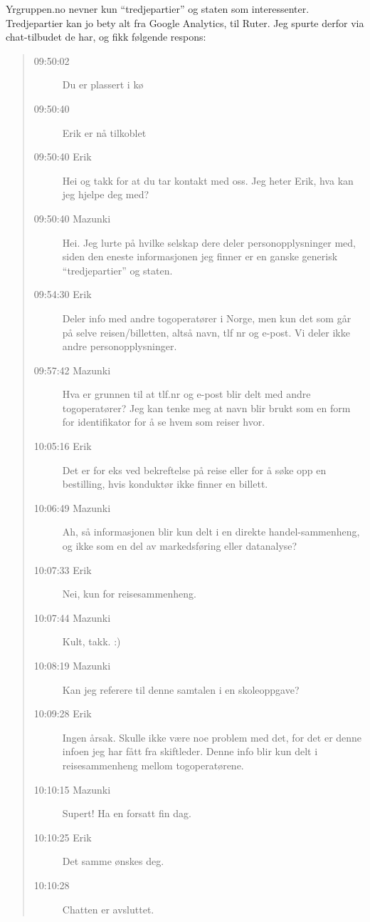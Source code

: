\documentclass{../../myassignment}
\begin{document}
	\begin{answer}
		Yrgruppen.no nevner kun ``tredjepartier'' og staten som interessenter. Tredjepartier kan jo bety alt fra Google Analytics, til Ruter. Jeg spurte derfor via chat-tilbudet de har, og fikk følgende respons: 

			\begin{quote}
				\begin{description}
					\item [09:50:02] Du er plassert i kø
					\item [09:50:40] Erik er nå tilkoblet
					\item [09:50:40 Erik] Hei og takk for at du tar kontakt med oss. Jeg heter Erik, hva kan jeg hjelpe deg med?
					\item [09:50:40 Mazunki] Hei. Jeg lurte på hvilke selskap dere deler personopplysninger med, siden den eneste informasjonen jeg finner er en ganske generisk ``tredjepartier'' og staten.
					\item [09:54:30 Erik] Deler info med andre togoperatører i Norge, men kun det som går på selve reisen/billetten, altså navn, tlf nr og e-post. Vi deler ikke andre personopplysninger.
					\item [09:57:42 Mazunki] Hva er grunnen til at tlf.nr og e-post blir delt med andre togoperatører? Jeg kan tenke meg at navn blir brukt som en form for identifikator for å se hvem som reiser hvor.
					\item [10:05:16 Erik] Det er for eks ved bekreftelse på reise eller for å søke opp en bestilling, hvis konduktør ikke finner en billett.
					\item [10:06:49 Mazunki] Ah, så informasjonen blir kun delt i en direkte handel-sammenheng, og ikke som en del av markedsføring eller datanalyse?
					\item [10:07:33 Erik] Nei, kun for reisesammenheng.
					\item [10:07:44 Mazunki] Kult, takk. :)
					\item [10:08:19 Mazunki] Kan jeg referere til denne samtalen i en skoleoppgave?
					\item [10:09:28 Erik] Ingen årsak. Skulle ikke være noe problem med det, for det er denne infoen jeg har fått fra skiftleder. Denne info blir kun delt i reisesammenheng mellom togoperatørene.
					\item [10:10:15 Mazunki] Supert! Ha en forsatt fin dag.
					\item [10:10:25 Erik] Det samme ønskes deg.
					\item [10:10:28] Chatten er avsluttet.
				\end{description}
			\end{quote}

	\end{answer}
\end{document}
